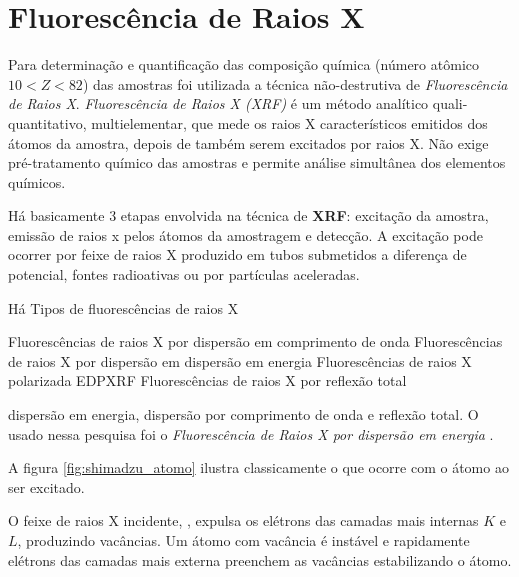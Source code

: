 \section{Fluorescência de Raios X}

Para determinação e quantificação das composição química (número atômico $ 10 < Z < 82$)
das amostras foi utilizada a técnica não-destrutiva de \textit{Fluorescência de Raios X}.
\textit{Fluorescência de Raios X (XRF)} é um método analítico quali-quantitativo, 
multielementar, que mede os raios X característicos emitidos dos átomos da amostra, 
depois de também serem excitados por raios X. Não exige pré-tratamento químico
das amostras e permite análise simultânea dos elementos químicos.

Há basicamente 3 etapas envolvida na técnica de \textbf{XRF}: 
excitação da amostra, emissão de raios x pelos átomos da amostragem
e detecção. A excitação pode ocorrer por feixe de raios X produzido em 
tubos submetidos a diferença de potencial, fontes radioativas 
ou por partículas aceleradas. 

Há Tipos de fluorescências de raios X

Fluorescências de raios X por dispersão em comprimento de onda
Fluorescências de raios X por dispersão em dispersão em energia
Fluorescências de raios X polarizada EDPXRF
Fluorescências de raios X por reflexão total

 dispersão em energia,
dispersão por comprimento de onda e reflexão total.
O usado nessa pesquisa foi o 
\textit{Fluorescência de Raios X por dispersão em energia} \cite{jenkins1988}.

A figura \ref{fig:shimadzu_atomo} ilustra classicamente o que ocorre com
o átomo ao ser excitado.


O feixe de raios X incidente, , expulsa os elétrons das camadas mais 
internas $K$ e $L$, produzindo vacâncias. 
Um átomo com vacância é instável e rapidamente elétrons das camadas 
mais externa preenchem as vacâncias estabilizando o átomo.

